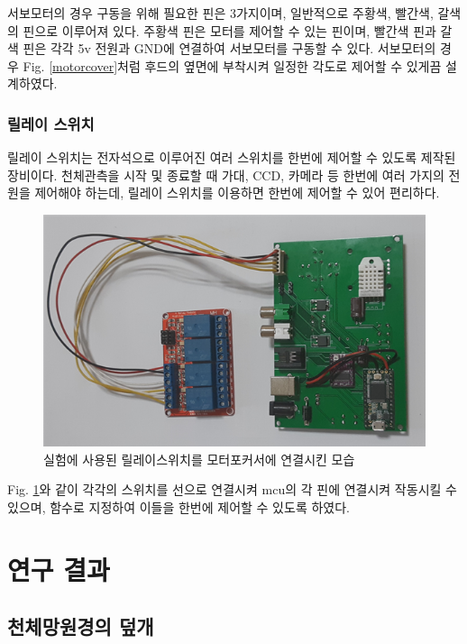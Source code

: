 \documentclass[twoside,11pt]{gshs_thesis}
\begin{document}
 서보모터의 경우 구동을 위해 필요한 핀은 3가지이며, 일반적으로 주황색, 빨간색, 갈색의 핀으로 이루어져 있다. 주황색 핀은 모터를 제어할 수 있는 핀이며, 빨간색 핀과 갈색 핀은 각각 5v 전원과 GND에 연결하여 서보모터를 구동할 수 있다. 서보모터의 경우 Fig. \ref{motorcover}처럼 후드의 옆면에 부착시켜 일정한 각도로 제어할 수 있게끔 설계하였다.



\subsubsection{릴레이 스위치}

 릴레이 스위치는 전자석으로 이루어진 여러 스위치를 한번에 제어할 수 있도록 제작된 장비이다. 천체관측을 시작 및 종료할 때 가대, CCD, 카메라 등 한번에 여러 가지의 전원을 제어해야 하는데, 릴레이 스위치를 이용하면 한번에 제어할 수 있어 편리하다. 

 \begin{figure}[h]
	\begin{center}
		\includegraphics[width = 12cm]{relay}
	\end{center}
	\caption{실험에 사용된 릴레이스위치를 모터포커서에 연결시킨 모습}
	\label{relay}
\end{figure}

 Fig. \ref{relay}와 같이 각각의 스위치를 선으로 연결시켜 mcu의 각 핀에 연결시켜 작동시킬 수 있으며, 함수로 지정하여 이들을 한번에 제어할 수 있도록 하였다.
 
\newpage
\section{연구 결과}

\subsection{천체망원경의 덮개}
\end{document}

